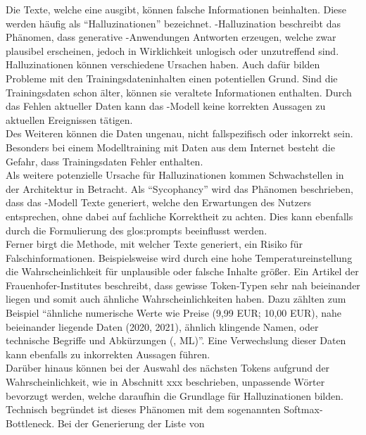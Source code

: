 \documentclass[../main.tex]{subfiles}
\begin{document}
Die Texte, welche eine  ausgibt, können falsche Informationen beinhalten. Diese werden häufig als "`Halluzinationen"' bezeichnet. -Halluzination beschreibt 
das Phänomen, dass generative -Anwendungen Antworten erzeugen, welche zwar plausibel erscheinen, jedoch in Wirklichkeit unlogisch oder unzutreffend sind\cite{hallucinationForewarning}.\\
Halluzinationen können verschiedene Ursachen haben. Auch dafür bilden Probleme mit den Trainingsdateninhalten einen potentiellen Grund. Sind die Trainingsdaten schon älter,
können sie veraltete Informationen enthalten. Durch das Fehlen aktueller Daten kann das -Modell keine korrekten Aussagen zu aktuellen Ereignissen tätigen.\\ Des 
Weiteren können die Daten ungenau, nicht fallspezifisch oder inkorrekt sein. Besonders bei einem Modelltraining mit Daten aus dem Internet besteht die Gefahr, dass 
Trainingsdaten Fehler enthalten.\\ Als weitere potenzielle Ursache für Halluzinationen kommen Schwachstellen in der Architektur in Betracht. Als "`Sycophancy"' wird das 
Phänomen beschrieben, dass das -Modell Texte generiert, welche den Erwartungen des Nutzers entsprechen, ohne dabei auf fachliche Korrektheit zu achten. Dies kann ebenfalls 
durch die Formulierung des \gls{glos:prompt}s beeinflusst werden.\cite{allgemHalluzinationen} \\
Ferner birgt die Methode, mit welcher  Texte generiert, ein Risiko für Falschinformationen. Beispielsweise wird durch eine hohe Temperatureinstellung die 
Wahrscheinlichkeit für unplausible oder falsche Inhalte größer. Ein Artikel der Frauenhofer-Institutes beschreibt, dass gewisse Token-Typen sehr nah beieinander liegen 
und somit auch ähnliche Wahrscheinlichkeiten haben. Dazu zählten zum Beispiel "`ähnliche numerische Werte wie Preise (9,99 EUR; 10,00 EUR), nahe beieinander liegende 
Daten (2020, 2021), ähnlich klingende Namen, oder technische Begriffe und Abkürzungen (, ML)"'\cite{halluzinationenFraunhofer}. Eine Verwechslung dieser Daten kann ebenfalls zu inkorrekten Aussagen 
führen.\\
Darüber hinaus können bei der Auswahl des nächsten Tokens aufgrund der Wahrscheinlichkeit, wie in Abschnitt xxx beschrieben, unpassende Wörter bevorzugt werden, welche 
daraufhin die Grundlage für Halluzinationen bilden. Technisch begründet ist dieses Phänomen mit dem sogenannten Softmax-Bottleneck. Bei der Generierung der Liste von 
\end{document}
